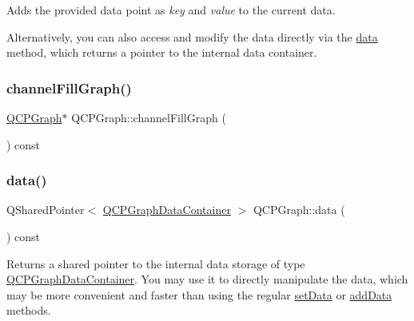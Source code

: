 Adds the provided data point as {\itshape key} and {\itshape value} to the current data.

Alternatively, you can also access and modify the data directly via the \mbox{\hyperlink{class_q_c_p_graph_a141aa31a1f19bbd0ce60f55eaeb9ea60}{data}} method, which returns a pointer to the internal data container. \mbox{\label{class_q_c_p_graph_a84277b1655474453a5c83318053414d5}} 
\subsubsection{\texorpdfstring{channelFillGraph()}{channelFillGraph()}}
{\footnotesize\ttfamily \mbox{\hyperlink{class_q_c_p_graph}{Q\+C\+P\+Graph}}$\ast$ Q\+C\+P\+Graph\+::channel\+Fill\+Graph (\begin{DoxyParamCaption}{ }\end{DoxyParamCaption}) const\hspace{0.3cm}{\ttfamily [inline]}}

\mbox{\label{class_q_c_p_graph_a141aa31a1f19bbd0ce60f55eaeb9ea60}} 
\subsubsection{\texorpdfstring{data()}{data()}}
{\footnotesize\ttfamily Q\+Shared\+Pointer$<$ \mbox{\hyperlink{qcustomplot_8h_a2e5583d1ae212f0deb10537cf975a15a}{Q\+C\+P\+Graph\+Data\+Container}} $>$ Q\+C\+P\+Graph\+::data (\begin{DoxyParamCaption}{ }\end{DoxyParamCaption}) const\hspace{0.3cm}{\ttfamily [inline]}}

Returns a shared pointer to the internal data storage of type \mbox{\hyperlink{qcustomplot_8h_a2e5583d1ae212f0deb10537cf975a15a}{Q\+C\+P\+Graph\+Data\+Container}}. You may use it to directly manipulate the data, which may be more convenient and faster than using the regular \mbox{\hyperlink{class_q_c_p_graph_a1eae9429a316b008e2d99b2d65a54395}{set\+Data}} or \mbox{\hyperlink{class_q_c_p_graph_ae0555c0d3fe0fa7cb8628f88158d420f}{add\+Data}} methods. \mbox{\label{class_q_c_p_graph_a2a958a5c6a6e1e4a03556be88b6fe37e}} 
